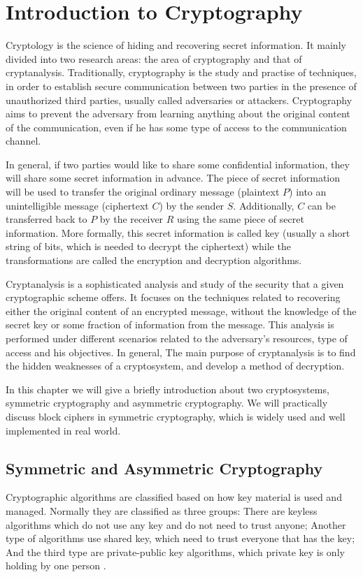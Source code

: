 \chapter{Introduction to Cryptography} \label{ch:ItC}
Cryptology is the science of hiding and recovering secret information. It mainly divided into two research areas: the area of cryptography and that of cryptanalysis. Traditionally, cryptography is the study and practise of techniques, in order to establish secure communication between two parties in the presence of unauthorized third parties, usually called adversaries or attackers. Cryptography aims to prevent the adversary from learning anything about the original content of the communication, even if he has some type of access to the communication channel. 

In general, if two parties would like to share some confidential information, they will share some secret information in advance. The piece of secret information will be used to transfer the original ordinary message (plaintext $P$) into an unintelligible message (ciphertext $C$) by the sender $S$. Additionally, $C$ can be transferred back to $P$ by the receiver $R$ using the same piece of secret information. More formally, this secret information is called key (usually a short string of bits, which is needed to decrypt the ciphertext) while the transformations are called the encryption and decryption algorithms. 

Cryptanalysis is a sophisticated analysis and study of the security that a given cryptographic scheme offers. It focuses on the techniques related to recovering either the original content of an encrypted message, without the knowledge of the secret key or some fraction of information from the message. This analysis is performed under different scenarios related to the adversary's resources, type of access and his objectives. In general, The main purpose of cryptanalysis is to find the hidden weaknesses of a cryptosystem, and develop a method of decryption.

In this chapter we will give a briefly introduction about two cryptosystems, symmetric cryptography and asymmetric cryptography. We will practically discuss block ciphers in symmetric cryptography, which is widely used and well implemented in real world. 

\section{Symmetric and Asymmetric Cryptography}
Cryptographic algorithms are classified based on how key material is used and managed. Normally they are classified as three groups: There are keyless algorithms which do not use any key and do not need to trust anyone; Another type of algorithms use shared key, which need to trust everyone that has the key; And the third type are private-public key algorithms, which private key is only holding by one person \cite{PrCryEngCourtois}.


